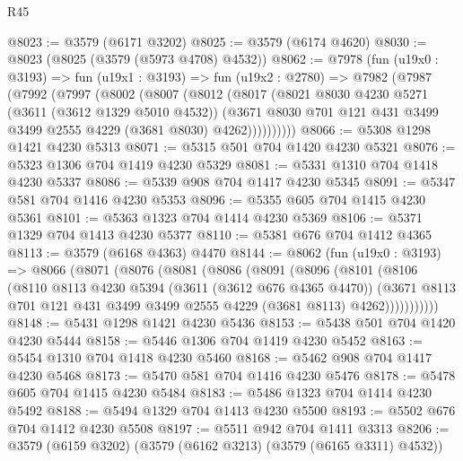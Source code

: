 \begin{lexlean}{R45}
\begin{coremodule}
@8023 := @3579 (@6171 @3202)
@8025 := @3579 (@6174 @4620)
@8030 := @8023 (@8025 (@3579 (@5973 @4708) @4532))
@8062 := @7978
    (fun (u19x0 : @3193) =>
    fun (u19x1 : @3193) =>
    fun (u19x2 : @2780) =>
    @7982
      (@7987
        (@7992
          (@7997
            (@8002
              (@8007
                (@8012
                  (@8017
                    (@8021
                      @8030
                      @4230
                      @5271
                      (@3611 (@3612 @1329 @5010 @4532))
                      (@3671
                        @8030
                        @701
                        @121
                        @431
                        @3499
                        @3499
                        @2555
                        @4229
                        (@3681 @8030)
                        @4262))))))))))
@8066 := @5308 @1298 @1421 @4230 @5313
@8071 := @5315 @501 @704 @1420 @4230 @5321
@8076 := @5323 @1306 @704 @1419 @4230 @5329
@8081 := @5331 @1310 @704 @1418 @4230 @5337
@8086 := @5339 @908 @704 @1417 @4230 @5345
@8091 := @5347 @581 @704 @1416 @4230 @5353
@8096 := @5355 @605 @704 @1415 @4230 @5361
@8101 := @5363 @1323 @704 @1414 @4230 @5369
@8106 := @5371 @1329 @704 @1413 @4230 @5377
@8110 := @5381 @676 @704 @1412 @4365
@8113 := @3579 (@6168 @4363) @4470
@8144 := @8062
    (fun (u19x0 : @3193) =>
    @8066
      (@8071
        (@8076
          (@8081
            (@8086
              (@8091
                (@8096
                  (@8101
                    (@8106
                      (@8110
                        @8113
                        @4230
                        @5394
                        (@3611 (@3612 @676 @4365 @4470))
                        (@3671
                          @8113
                          @701
                          @121
                          @431
                          @3499
                          @3499
                          @2555
                          @4229
                          (@3681 @8113)
                          @4262)))))))))))
@8148 := @5431 @1298 @1421 @4230 @5436
@8153 := @5438 @501 @704 @1420 @4230 @5444
@8158 := @5446 @1306 @704 @1419 @4230 @5452
@8163 := @5454 @1310 @704 @1418 @4230 @5460
@8168 := @5462 @908 @704 @1417 @4230 @5468
@8173 := @5470 @581 @704 @1416 @4230 @5476
@8178 := @5478 @605 @704 @1415 @4230 @5484
@8183 := @5486 @1323 @704 @1414 @4230 @5492
@8188 := @5494 @1329 @704 @1413 @4230 @5500
@8193 := @5502 @676 @704 @1412 @4230 @5508
@8197 := @5511 @942 @704 @1411 @3313
@8206 := @3579 (@6159 @3202) (@3579 (@6162 @3213) (@3579 (@6165 @3311) @4532))

\end{coremodule}
\end{lexlean}
